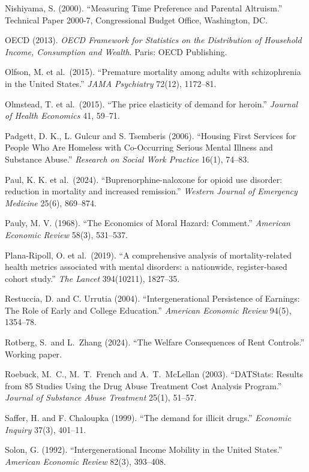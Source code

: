 \documentclass[10pt]{article}
\begin{document}
{\begin{list}{}{\setlength{\leftmargin}{1.5em}\setlength{\itemindent}{-1.5em}\setlength{\itemsep}{0.35em}\setlength{\parsep}{0em}}
\item Nishiyama, S. (2000). ``Measuring Time Preference and Parental Altruism.'' Technical Paper 2000-7, Congressional Budget Office, Washington, DC.
\item OECD (2013). \emph{OECD Framework for Statistics on the Distribution of Household Income, Consumption and Wealth}. Paris: OECD Publishing.
\item Olfson, M. et al.\ (2015). ``Premature mortality among adults with schizophrenia in the United States.'' \emph{JAMA Psychiatry} 72(12), 1172--81.
\item Olmstead, T. et al.\ (2015). ``The price elasticity of demand for heroin.'' \emph{Journal of Health Economics} 41, 59--71.
\item Padgett, D. K., L. Gulcur and S. Tsemberis (2006). ``Housing First Services for People Who Are Homeless with Co-Occurring Serious Mental Illness and Substance Abuse.'' \emph{Research on Social Work Practice} 16(1), 74--83.
\item Paul, K. K. et al.\ (2024). ``Buprenorphine-naloxone for opioid use disorder: reduction in mortality and increased remission.'' \emph{Western Journal of Emergency Medicine} 25(6), 869--874.
\item Pauly, M. V. (1968). ``The Economics of Moral Hazard: Comment.'' \emph{American Economic Review} 58(3), 531--537.
\item Plana-Ripoll, O. et al.\ (2019). ``A comprehensive analysis of mortality-related health metrics associated with mental disorders: a nationwide, register-based cohort study.'' \emph{The Lancet} 394(10211), 1827--35.
\item Restuccia, D. and C. Urrutia (2004). ``Intergenerational Persistence of Earnings: The Role of Early and College Education.'' \emph{American Economic Review} 94(5), 1354--78.
\item Rotberg, S.\ and L.\ Zhang (2024). ``The Welfare Consequences of Rent Controls.'' Working paper.
\item Roebuck, M.\ C., M.\ T.\ French and A.\ T.\ McLellan (2003). ``DATStats: Results from 85 Studies Using the Drug Abuse Treatment Cost Analysis Program.'' \emph{Journal of Substance Abuse Treatment} 25(1), 51--57.
\item Saffer, H. and F. Chaloupka (1999). ``The demand for illicit drugs.'' \emph{Economic Inquiry} 37(3), 401--11.
\item Solon, G. (1992). ``Intergenerational Income Mobility in the United States.'' \emph{American Economic Review} 82(3), 393--408.

\end{list}}
\end{document}
